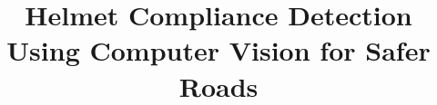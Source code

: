 \documentclass[12pt]{cspcccsthesis}
\title{Helmet Compliance Detection Using Computer Vision for Safer Roads}
\begin{document}

\begin{frontmatter}
    
    
    \makeAbstract
    \makeTOC
    \makeListOfTables
    \makeListOfFigures
\end{frontmatter}

\begin{thesisbody}
    
    
    
    
    
    \makeBibliography
    
    
\end{thesisbody}
\end{document}
